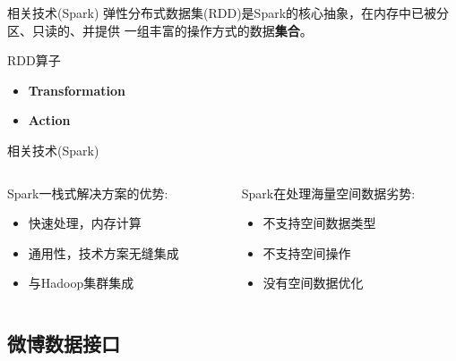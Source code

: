 \begin{frame}[t]{相关技术(Spark)}
    弹性分布式数据集(RDD)是Spark的核心抽象，在内存中已被分区、只读的、并提供
    一组丰富的操作方式的数据\textbf{集合}。

    \vspace{2em}
    \pause
    \alert{RDD算子}
    \begin{itemize}
        \item \textbf{Transformation} 
        \item \textbf{Action}
    \end{itemize}

\end{frame}

\begin{frame}[c]{相关技术(Spark)}
    \begin{columns}
        \begin{column}{0.5 \textwidth}
            Spark一栈式解决方案的\alert{优势:}
            
            \vspace{0.5em}
            \begin{itemize}
                \item 快速处理，内存计算
                \item 通用性，技术方案无缝集成
                \item 与Hadoop集群集成
            \end{itemize}
        \end{column}

        \pause
        \begin{column}{0.5 \textwidth}
            Spark在处理海量空间数据\alert{劣势:}

            \vspace{0.5em}
            \begin{itemize}
                \item 不支持空间数据类型
                \item 不支持空间操作
                \item 没有空间数据优化
            \end{itemize}
        \end{column}
    \end{columns}

\end{frame}

\subsection{微博数据接口}

